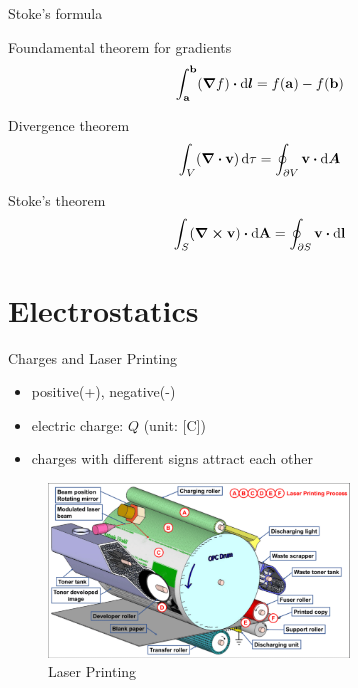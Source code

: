 \documentclass{beamer}
\begin{document}
\begin{frame}{Stoke's formula}
	\begin{beamerboxesrounded}{Foundamental theorem for gradients}
		\begin{equation}
			\int_{\vb{a}}^{\vb{b}} (\grad f) \vdot \dd{\vb*{l}} = f(\vb{a}) - f(\vb{b})
		\end{equation}
	\end{beamerboxesrounded}
	
	\begin{beamerboxesrounded}{Divergence theorem}
		\begin{equation}
			\int_V (\div \vb{v}) \dd{\tau} = \oint_{\partial V} \vb{v} \vdot \dd{\vb*{A}}
		\end{equation}
	\end{beamerboxesrounded}

	\begin{beamerboxesrounded}{Stoke's theorem}
		\begin{equation}
			\int_S (\curl \vb{v}) \vdot \dd{\vb{A}} = \oint_{\partial S} \vb{v} \vdot \dd{\vb{l}}
		\end{equation}
	\end{beamerboxesrounded}
\end{frame}





\section{Electrostatics}

\begin{frame}{Charges and Laser Printing}
	\begin{itemize}
		\item positive(+), negative(-)
		\item electric charge: $Q$ (unit: [C])
		\item charges with different signs attract each other
	\end{itemize}
	\vspace{.5em}
	\begin{figure}[htbp]
		\centering
		\includegraphics[width=8cm]{Images/Laser-printer}
		\caption{Laser Printing}
	\end{figure}
\end{frame}
\end{document}
